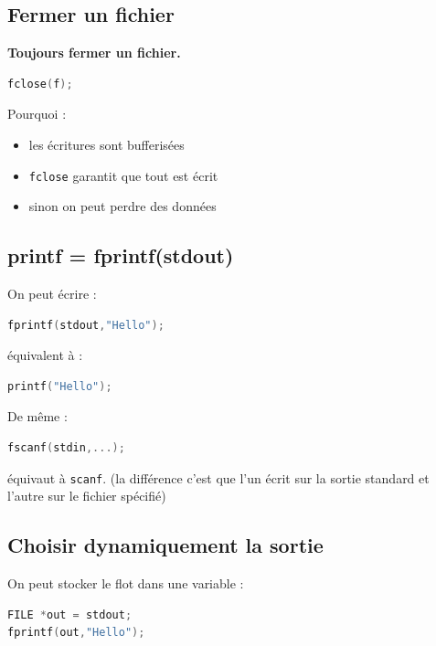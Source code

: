 \subsection{Fermer un fichier}

\textbf{Toujours fermer un fichier.}

\begin{lstlisting}[language=C]
fclose(f);
\end{lstlisting}

Pourquoi :

\begin{itemize}
    \item les écritures sont bufferisées
    \item \texttt{fclose} garantit que tout est écrit
    \item sinon on peut perdre des données
\end{itemize}

\subsection{printf = fprintf(stdout)}

On peut écrire :

\begin{lstlisting}[language=C]
fprintf(stdout,"Hello");
\end{lstlisting}

équivalent à :

\begin{lstlisting}[language=C]
printf("Hello");
\end{lstlisting}

De même :

\begin{lstlisting}[language=C]
fscanf(stdin,...);
\end{lstlisting}

équivaut à \texttt{scanf}.
(la différence c'est que l'un écrit sur la sortie standard et l'autre sur le fichier spécifié)

\subsection{Choisir dynamiquement la sortie}

On peut stocker le flot dans une variable :

\begin{lstlisting}[language=C]
FILE *out = stdout;
fprintf(out,"Hello");
\end{lstlisting}

